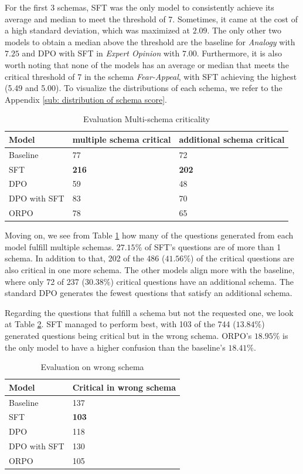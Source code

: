 \documentclass[11pt]{article}
\begin{document}
For the first 3 schemas, SFT was the only model to consistently achieve its average and median to meet the threshold of 7. Sometimes, it came at the cost of a high standard deviation, which was maximized at $2.09$. The only other two models to obtain a median above the threshold are the baseline for \textit{Analogy} with $7.25$ and DPO with SFT in \textit{Expert Opinion} with $7.00$. Furthermore, it is also worth noting that none of the models has an average or median that meets the critical threshold of 7 in the schema \textit{Fear-Appeal}, with SFT achieving the highest (5.49 and 5.00). To visualize the distributions of each schema, we refer to the Appendix \ref{sub: distribution of schema score}.
\begin{table} [H]
    \centering
    \begin{tabular}{p{1.4cm}p{2cm}p{2cm}}
        \hline
        \textbf{Model} & \textbf{multiple schema critical} & \textbf{additional schema critical}\\
        \hline
Baseline        &	77  & 72 \\
SFT	            &   \textbf{216} & \textbf{202}\\
DPO	            &   59 & 48\\
DPO with SFT	&   83 & 70\\
ORPO            &   78 & 65 \\
        \hline
    \end{tabular}
    \caption{Evaluation Multi-schema criticality}
    \label{tab: multi}
\end{table}

Moving on, we see from Table \ref{tab: multi} how many of the questions generated from each model fulfill multiple schemas. $27.15\%$ of SFT's questions are of more than 1 schema. In addition to that, 202 of the 486 ($41.56\%$) of the critical questions are also critical in one more schema. The other models align more with the baseline, where only 72 of 237 ($30.38\%$) critical questions have an additional schema. The standard DPO generates the fewest questions that satisfy an additional schema. 

Regarding the questions that fulfill a schema but not the requested one, we look at Table \ref{tab: other}. SFT managed to perform best, with 103 of the 744 ($13.84\%$) generated questions being critical but in the wrong schema. ORPO's $18.95\%$ is the only model to have a higher confusion than the baseline's $18.41\%$.

\begin{table} [H]
    \centering
    \begin{tabular}{ll}
        \hline
        \textbf{Model} & \textbf{Critical in wrong schema}\\
        \hline
Baseline        &	137  \\
SFT	            &   \textbf{103}\\
DPO	            &   118    \\
DPO with SFT	&   130   \\
ORPO            &   105   \\
        \hline
    \end{tabular}
    \caption{Evaluation on wrong schema}
    \label{tab: other}
\end{table}
\end{document}
